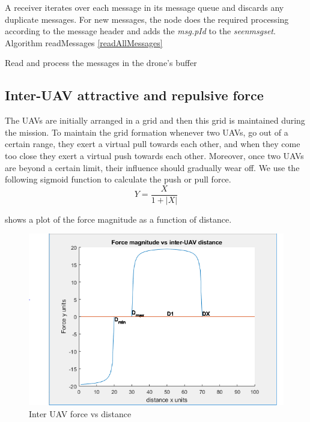 A receiver iterates over each message in its message queue and discards any duplicate messages. For new messages, the node does the required processing according to the message header and adds the \emph{msg.pId} to the \emph{seen\textunderscore msg\textunderscore set}. Algorithm readMessages \ref{readAllMessages}


\begin{algorithm}[H]
\SetAlgoLined
\DontPrintSemicolon
{}
\caption{Read and process the messages in the drone's buffer} \label{readAllMessages}
\end{algorithm}



\subsection{Inter-UAV attractive and repulsive force}
The UAVs are initially arranged in a grid and then this grid is maintained during the mission. To maintain the grid formation whenever two UAVs, go out of a certain range, they exert a virtual pull towards each other, and when they come too close they exert a virtual push towards each other. Moreover, once two UAVs are beyond a certain limit, their influence should gradually wear off. We use the following sigmoid function to calculate the push or pull force. 
\begin{equation}
    Y = \frac{X}{1 + |X|}
\end{equation}

 shows a plot of the force magnitude as a function of distance.

\begin{figure}
\centering
\includegraphics[width=1\textwidth]{ncsuthesis-0.6/Chapter-4/figs/force_function}
\caption{Inter UAV force vs distance}
\label{fig:force_fn}
\end{figure}

